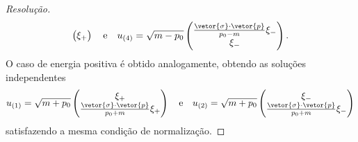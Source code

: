 \begin{proof}[Resolução]
\begin{equation*}
\begin{pmatrix}
            \xi_+
        \end{pmatrix}
        \quad\text{e}\quad
        u_{(4)} = \sqrt{m - p_0}\begin{pmatrix}
            \frac{\vetor{\sigma}\cdot\vetor{p}}{p_0 - m} \xi_-\\
            \xi_-
        \end{pmatrix}.
    \end{equation*}
    O caso de energia positiva é obtido analogamente, obtendo as soluções independentes
    \begin{equation*}
        u_{(1)} = \sqrt{m + p_0} \begin{pmatrix}
            \xi_+\\
            \frac{\vetor{\sigma}\cdot\vetor{p}}{p_0 + m} \xi_+
        \end{pmatrix}
        \quad\text{e}\quad
        u_{(2)} = \sqrt{m + p_0} \begin{pmatrix}
            \xi_-\\
            \frac{\vetor{\sigma}\cdot\vetor{p}}{p_0 + m} \xi_-
        \end{pmatrix}
    \end{equation*}
    satisfazendo a mesma condição de normalização.
\end{proof}
